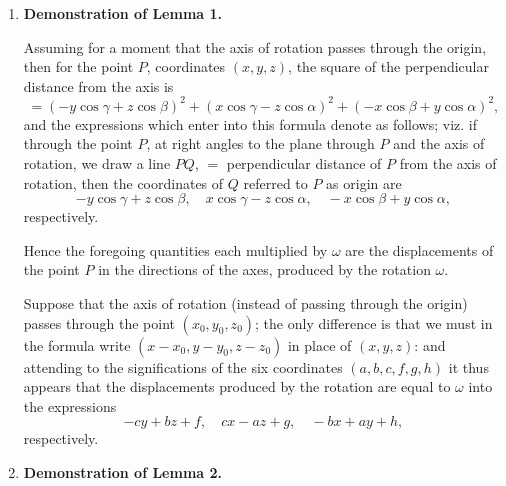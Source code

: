 \documentclass[12pt,a4paper]{article}
\theoremstyle{plain}
\theoremstyle{definition}
\theoremstyle{remark}
\begin{document}
\begin{enumerate}[label=\arabic*.]
Secondly, for a system of forces $P_1$ along the line $(a_1,b_1,c_1,f_1,g_1,h_1)$, \&c., the condition of equilibrium as given by the principle of virtual velocities is
\[\Sigma P(a\delta x + b\delta y + c\delta z + f\delta p + g\delta q + h\delta r) = 0;\]
or, what is the same thing, we must have
\[\Sigma Pa = 0, \quad \Sigma Pb = 0, \quad \Sigma Pc = 0, \quad \Sigma Pf = 0, \quad \Sigma Pg = 0, \quad \Sigma Ph = 0,\]
which are therefore the conditions for the equilibrium of the forces $P_1$, $P_2$, \&c.

Comparing the two results we see that the conditions for the equilibrium of the rotations $\omega_1$, $\omega_2$, \&c., are the same as those for the equilibrium of the forces $P_1$, $P_2$, \&c.; and since, for rotations and forces respectively, we pass at once from the theory of equilibrium to that of composition; the rules of composition are the same in each case.

\item \textbf{Demonstration of Lemma 1.}

Assuming for a moment that the axis of rotation passes through the origin, then for the point $P$, coordinates $(x,y,z)$, the square of the perpendicular distance from the axis is
\[= (-y\cos\gamma + z\cos\beta)^2 + (x\cos\gamma - z\cos\alpha)^2 + (-x\cos\beta + y\cos\alpha)^2,\]
and the expressions which enter into this formula denote as follows; viz. if through the point $P$, at right angles to the plane through $P$ and the axis of rotation, we draw a line $PQ$, $=$ perpendicular distance of $P$ from the axis of rotation, then the coordinates of $Q$ referred to $P$ as origin are
\[-y\cos\gamma + z\cos\beta, \quad x\cos\gamma - z\cos\alpha, \quad -x\cos\beta + y\cos\alpha,\]
respectively.

Hence the foregoing quantities each multiplied by $\omega$ are the displacements of the point $P$ in the directions of the axes, produced by the rotation $\omega$.

Suppose that the axis of rotation (instead of passing through the origin) passes through the point $(x_0, y_0, z_0)$; the only difference is that we must in the formula write $(x-x_0, y-y_0, z-z_0)$ in place of $(x,y,z)$: and attending to the significations of the six coordinates $(a,b,c,f,g,h)$ it thus appears that the displacements produced by the rotation are equal to $\omega$ into the expressions
\[-cy + bz + f, \quad cx - az + g, \quad -bx + ay + h,\]
respectively.

\item \textbf{Demonstration of Lemma 2.}


\end{enumerate}
\end{document}
